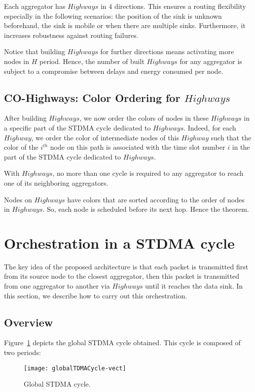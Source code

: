 \begin{remark}
Each aggregator has $Highways$ in $4$ directions. This ensures a routing flexibility especially in the following scenarios: the position of the sink is unknown beforehand, the sink is mobile or when there are multiple sinks. Furthermore, it increases robustness against routing failures.
\end{remark}

\begin{remark}
Notice that building $Highways$ for further directions means activating more nodes in $H$ period. 
Hence, the number of built $Highways$ for any aggregator is subject to a compromise between delays and energy consumed per node. 
\end{remark}


\subsection{CO-Highways: Color Ordering for $Highways$}
After building $Highways$, we now order the colors of nodes in these $Highways$ in a specific part of the STDMA cycle dedicated to $Highways$. Indeed, for each $Highway$, we order the color of intermediate nodes of this $Highway$ such that the color of the $i^{th}$ node on this path is associated with the time slot number $i$ in the part of the STDMA cycle dedicated to $Highways$. 

\begin{theorem}
With $Highways$, no more than one cycle is required to any aggregator to reach one of its neighboring aggregators.
\end{theorem}
\proof
Nodes on $Highways$ have colors that are sorted according to the order of nodes in $Highways$. So, each node is scheduled before its next hop. Hence the theorem.
\endproof


\section{Orchestration in a STDMA cycle}\label{sec:orchestration}
The key idea of the proposed architecture is that each packet is transmitted first from its source node to the closest aggregator, then this packet is transmitted from one aggregator to another via $Highways$ until it reaches the data sink. 
In this section, we describe how to carry out this orchestration. 
\subsection{Overview}
Figure~\ref{fig:globalTDMA} depicts the global STDMA cycle obtained. This cycle is composed of two periods:
\begin{figure}[H]
\centering
\texttt{[image: globalTDMACycle-vect]}
\caption{Global STDMA cycle.\label{fig:globalTDMA}}
\end{figure}

